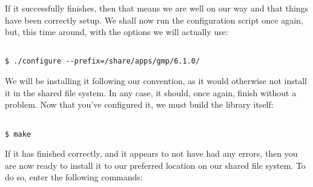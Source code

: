 \documentclass[]{article}
\begin{document}
                                                                                                                                                If it successfully finishes, then that means we are well on our way and that things have been correctly setup. We shall now run
                                                                                                                                                the configuration script once again, but, this time around, with the options we will actually use:
                                                                                                                                                \begin{lstlisting}
                                                                                                                                                $ ./configure --prefix=/share/apps/gmp/6.1.0/
                                                                                                                                                \end{lstlisting}
                                                                                                                                                We will be installing it following our convention, as it would otherwise not install it in the shared file system. In any case, it 
                                                                                                                                                should, once again, finish without a problem. Now that you've configured it, we must build the library itself:
                                                                                                                                                \begin{lstlisting}
                                                                                                                                                $ make
                                                                                                                                                \end{lstlisting}
                                                                                                                                                If it has finished correctly, and it appears to not have had any errors, then you are now ready to install it to our preferred location
                                                                                                                                                on our shared file system. To do so, enter the following commands:
\end{document}
